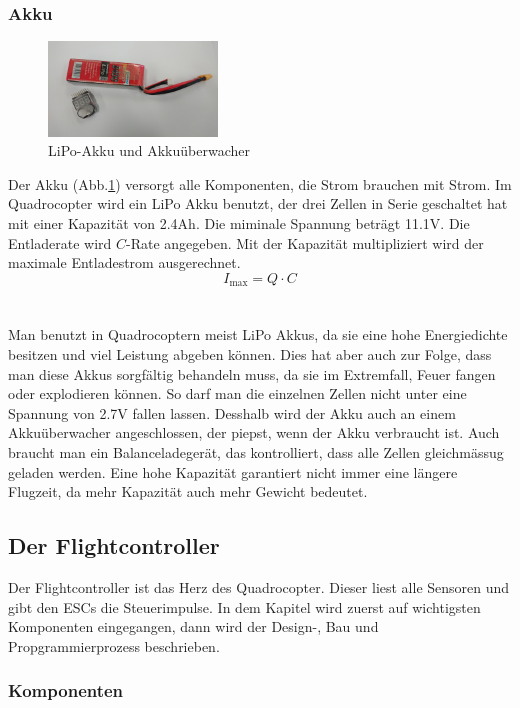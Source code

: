 \documentclass[12pt,a4paper, ngerman]{article}
\begin{document}
\subsubsection{Akku}
\begin{figure}
\centering
\includegraphics[width=0.4\textwidth]{accu.jpg}
\caption[]{LiPo-Akku und Akkuüberwacher} \label{accu}
\end{figure}
Der Akku (Abb.\ref{accu}) versorgt alle Komponenten, die Strom brauchen mit Strom. Im Quadrocopter wird ein LiPo Akku benutzt, der drei Zellen in Serie geschaltet hat mit einer Kapazität von 2.4Ah. Die miminale Spannung beträgt 11.1V. Die Entladerate wird $C$-Rate angegeben. Mit der Kapazität multipliziert wird der maximale Entladestrom ausgerechnet.\cite{website:fpvracing.ch_Mult_Komp}
\begin{equation}
I_{\text{max}}=Q\cdot C
\end{equation}\\ \\
Man benutzt in Quadrocoptern meist LiPo Akkus, da sie eine hohe Energiedichte besitzen und viel Leistung abgeben können. Dies hat aber auch zur Folge, dass man diese Akkus sorgfältig behandeln muss, da sie im Extremfall, Feuer fangen oder explodieren können. So darf man die einzelnen Zellen nicht unter eine Spannung von 2.7V fallen lassen. Desshalb wird der Akku auch an einem Akkuüberwacher angeschlossen, der piepst, wenn der Akku verbraucht ist. Auch braucht man ein Balanceladegerät, das kontrolliert, dass alle Zellen gleichmässug geladen werden. Eine hohe Kapazität garantiert nicht immer eine längere Flugzeit, da mehr Kapazität auch mehr Gewicht bedeutet.\cite{website:fpvracing.ch_Mult_Komp}
\newpage

\subsection{Der Flightcontroller}
Der Flightcontroller ist das Herz des Quadrocopter. Dieser liest alle Sensoren und gibt den ESCs die Steuerimpulse. In dem Kapitel wird zuerst auf wichtigsten Komponenten eingegangen, dann wird der Design-, Bau und Propgrammierprozess beschrieben.
\subsubsection{Komponenten}
\end{document}
